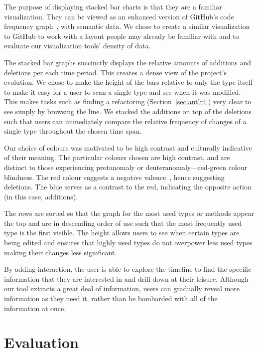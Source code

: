 The purpose of displaying stacked bar charts is that they are a familiar visualization. They can be viewed as an enhanced version of GitHub's code frequency graph~\cite{github-graphs}, with semantic data. We chose to create a similar visualization to GitHub to work with a layout people may already be familiar with and to evaluate our visualization tools' density of data.

The stacked bar graphs succinctly displays the relative amounts of additions and deletions per each time period. This creates a dense view of the project's evolution. We chose to make the height of the bars relative to only the type itself to make it easy for a user to scan a single type and see when it was modified. This makes tasks such as finding a refactoring (Section~\ref{sec:antlr4}) very clear to see simply by browsing the line. We stacked the additions on top of the deletions such that users can immediately compare the relative frequency of changes of a single type throughout the chosen time span.

Our choice of colours was motivated to be high contrast and culturally indicative of their meaning. The particular colours chosen are high contrast, and are distinct to those experiencing protanomaly or deuteranomaly---red-green colour blindness. The red colour suggests a negative valence~\cite{moller2009}, hence suggesting deletions. The blue serves as a contrast to the red, indicating the opposite action (in this case, additions).

The rows are sorted so that the graph for the most used types or methods appear the top and are in descending order of use such that the most frequently used type is the first visible. The height allows users to see when certain types are being edited and ensures that highly used types do not overpower less used types making their changes less significant.

By adding interaction, the user is able to explore the timeline to find the specific information that they are interested in and drill-down at their leisure. Although our tool extracts a great deal of information, users can gradually reveal more information as they need it, rather than be bombarded with all of the information at once.


\section{Evaluation}
\label{sec:eval}

